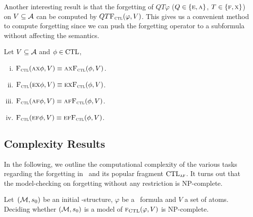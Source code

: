 \documentclass{article}
\begin{document}
Another interesting result is that the forgetting of $Q T \varphi$ ($Q\in \{\textsc{e}, \textsc{a}\}$, $T \in \{\textsc{f}, \textsc{x}\}$) on $V\subseteq {\cal A}$ can be computed by $QT {\textsc{F}_{\textsc{ctl}}}(\varphi, V)$. This gives us a convenient method to compute forgetting since we can push the forgetting operator to a subformula without affecting the semantics.
\begin{proposition}[Homogeneity]\label{pro:ctl:forget:2}
  Let $V\subseteq\cal A$ and $\phi \in \textrm{CTL}$,%
  \begin{enumerate}[(i)]
    \item ${\textsc{F}_{\textsc{ctl}}}(\textsc{a}\textsc{x}\phi,V)\equiv \textsc{a}\textsc{x} {\textsc{F}_{\textsc{ctl}}}(\phi,V)$.
    \item ${\textsc{F}_{\textsc{ctl}}}(\textsc{e}\textsc{x}\phi,V)\equiv\textsc{e}\textsc{x} {\textsc{F}_{\textsc{ctl}}}(\phi,V)$.
    \item ${\textsc{F}_{\textsc{ctl}}}(\textsc{a} \textsc{f}\phi,V)\equiv \textsc{a} \textsc{f} {\textsc{F}_{\textsc{ctl}}}(\phi,V)$.
    \item ${\textsc{F}_{\textsc{ctl}}}(\textsc{e}\textsc{f}\phi,V)\equiv\textsc{e}\textsc{f} {\textsc{F}_{\textsc{ctl}}}(\phi,V)$.
  \end{enumerate}
\end{proposition}



\subsection{Complexity Results}
In the following, we outline the computational complexity of the various tasks regarding the forgetting in \CTL\ and its popular fragment $\textrm{CTL}_{\textsc{a}\textsc{f}}$.  It turns out that the model-checking on forgetting without any restriction is NP-complete.
\begin{proposition}\label{modelChecking}
Let~$({\cal M},s_0)$ be an initial \MPK-structure, $\varphi$ be a \CTL\ formula and $V$ a set of atoms. Deciding whether $({\cal M},s_0)$ is a model of ${\textsc{f}_{\textrm{CTL}}}(\varphi, V )$ is NP-complete.
\end{proposition}
\end{document}
